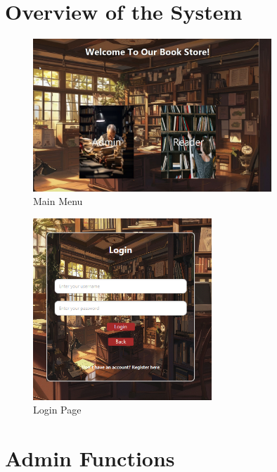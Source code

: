 \documentclass[a4paper,14pt]{extarticle}
\begin{document}
\section*{Overview of the System}
\begin{figure}[H]
    \centering
    \includegraphics[width=0.8\textwidth]{Media/Main Page.jpg}
    \caption{Main Menu}
\end{figure}

\begin{figure}[H]
    \centering
    \includegraphics[width=0.6\textwidth]{Media/Login.png}
    \caption{Login Page}
\end{figure}
\newpage
\section*{Admin Functions}
\end{document}
